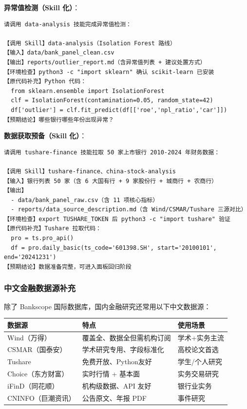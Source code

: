 \textbf{异常值检测（Skill 化）}：
\begin{lstlisting}
请调用 data-analysis 技能完成异常值检测：

【调用 Skill】data-analysis（Isolation Forest 路线）
【输入】data/bank_panel_clean.csv
【输出】reports/outlier_report.md（含异常值列表 + 建议处置方式）
【环境检查】python3 -c "import sklearn" 确认 scikit-learn 已安装
【原代码补充】Python 代码：
  from sklearn.ensemble import IsolationForest
  clf = IsolationForest(contamination=0.05, random_state=42)
  df['outlier'] = clf.fit_predict(df[['roe','npl_ratio','car']])
【预期结论】哪些银行哪些年份出现异常？
\end{lstlisting}

\textbf{数据获取预备（Skill 化）}：
\begin{lstlisting}
请调用 tushare-finance 技能拉取 50 家上市银行 2010-2024 年财务数据：

【调用 Skill】tushare-finance、china-stock-analysis
【输入】银行列表 50 家（含 6 大国有行 + 9 家股份行 + 城商行 + 农商行）
【输出】
  - data/bank_panel_raw.csv（含 11 项核心指标）
  - reports/data_source_description.md（含 Wind/CSMAR/Tushare 三源对比）
【环境检查】export TUSHARE_TOKEN 后 python3 -c "import tushare" 验证
【原代码补充】Tushare 拉取代码：
  pro = ts.pro_api()
  df = pro.daily_basic(ts_code='601398.SH', start='20100101', end='20241231')
【预期结论】数据准备完整，可进入面板回归阶段
\end{lstlisting}

\subsubsection{中文金融数据源补充}

除了 Bankscope 国际数据库，国内金融研究还常用以下中文数据源：

\begin{table}[H]
\centering
\begin{tabular}{lp{4cm}p{7cm}}
\toprule
\textbf{数据源} & \textbf{特点} & \textbf{使用场景} \\
\midrule
Wind（万得） & 覆盖全、数据全但需机构订阅 & 学术+实务主流 \\
CSMAR（国泰安） & 学术研究专用、字段标准化 & 高校论文首选 \\
Tushare & 免费开放、Python友好 & 学生/个人研究 \\
Choice（东方财富） & 实时行情 + 基本面 & 实务交易研究 \\
iFinD（同花顺） & 机构级数据、API 友好 & 银行业实务 \\
CNINFO（巨潮资讯） & 公告原文、年报 PDF & 事件研究 \\
\bottomrule
\end{tabular}
\end{table}


